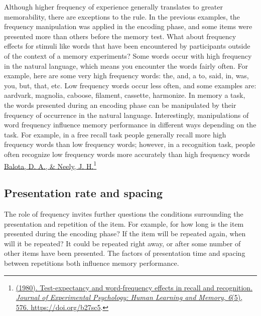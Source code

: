 \documentclass[
  oneside,
  12pt]{crumpbook}
\begin{document}
Although higher frequency of experience generally translates to greater memorability, there are exceptions to the rule. In the previous examples, the frequency manipulation was applied in the encoding phase, and some items were presented more than others before the memory test. What about frequency effects for stimuli like words that have been encountered by participants outside of the context of a memory experiments? Some words occur with high frequency in the natural language, which means you encounter the words fairly often. For example, here are some very high frequency words: the, and, a to, said, in, was, you, but, that, etc. Low frequency words occur less often, and some examples are: aardvark, magnolia, caboose, filament, cassette, harmonize. In memory a task, the words presented during an encoding phase can be manipulated by their frequency of occurrence in the natural language. Interestingly, manipulations of word frequency influence memory performance in different ways depending on the task. For example, in a free recall task people generally recall more high frequency words than low frequency words; however, in a recognition task, people often recognize low frequency words more accurately than high frequency words \protect\hyperlink{ref-balotaTestexpectancyWordfrequencyEffects1980}{Balota, D. A., \& Neely, J. H.}\footnote{\protect\hyperlink{ref-balotaTestexpectancyWordfrequencyEffects1980}{(1980). Test-expectancy and word-frequency effects in recall and recognition. \emph{Journal of Experimental Psychology: Human Learning and Memory}, \emph{6}(5), 576. \url{https://doi.org/b27sc5}}.}

\hypertarget{presentation-rate-and-spacing}{%
\subsection{Presentation rate and spacing}\label{presentation-rate-and-spacing}}

The role of frequency invites further questions the conditions surrounding the presentation and repetition of the item. For example, for how long is the item presented during the encoding phase? If the item will be repeated again, when will it be repeated? It could be repeated right away, or after some number of other items have been presented. The factors of presentation time and spacing between repetitions both influence memory performance.
\end{document}
